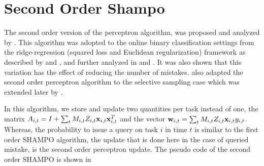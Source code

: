 \chapter{Second Order Shampo}

The second order version of the perceptron algorithm, was proposed and analyzed by 
\cite{CesaBianchiCoGe05}. This algorithm was adopted to the online binary classification 
settings from the ridge-regression (squared loss and Euclidean regularization) framework as described by 
\cite{hoerl1970ridge} and \cite{Vovk97}, and further analyzed in \cite{AzouryWa01} and  \cite{forster2002relative}. 
It was also shown that this variation has the effect of reducing the number of mistakes. 
\cite{DBLP:journals/jmlr/Cesa-BianchiGZ06a} also adapted the second order 
perceptron algorithm to the selective sampling case which was extended later by \cite{crammer2014doubly}.

In this algorithm, we store and update two quantities per task instead of one, the matrix 
$A_{i,t} = I+\sum_{t}M_{i,t}Z_{i,t}\mathbf{x}_{i,t}\mathbf{x}_{i,t}^T$ and the vector $\mathbf{w}_{i,t} = \sum_{t}M_{i,t}Z_{i,t} \mathbf{x}_{i,t}  y_{i,t}$.
Whereas, the probability to issue a query on task $i$ in time $t$ is similar to the first order SHAMPO algorithm,
the update  that is done here in the case of queried mistake, is the second order perceptron update.  
The pseudo code of the second order SHAMPO is shown in 


